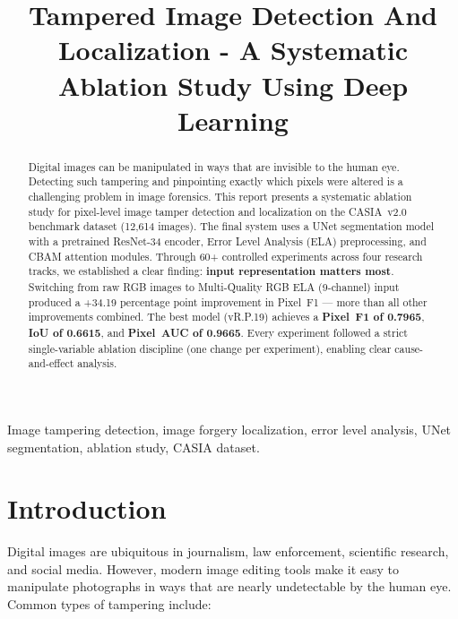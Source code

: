 \documentclass[conference]{IEEEtran}
\begin{document}
\title{ Tampered Image Detection And Localization - A Systematic Ablation Study Using Deep Learning}

\author{
}

\maketitle

\begin{abstract}
Digital images can be manipulated in ways that are invisible to the human eye. Detecting such tampering and pinpointing exactly which pixels were altered is a challenging problem in image forensics. This report presents a systematic ablation study for pixel-level image tamper detection and localization on the CASIA~v2.0 benchmark dataset (12,614 images). The final system uses a UNet segmentation model with a pretrained ResNet-34 encoder, Error Level Analysis (ELA) preprocessing, and CBAM attention modules. Through 60+ controlled experiments across four research tracks, we established a clear finding: \textbf{input representation matters most}. Switching from raw RGB images to Multi-Quality RGB ELA (9-channel) input produced a +34.19 percentage point improvement in Pixel~F1 --- more than all other improvements combined. The best model (vR.P.19) achieves a \textbf{Pixel~F1 of 0.7965}, \textbf{IoU of 0.6615}, and \textbf{Pixel~AUC of 0.9665}. Every experiment followed a strict single-variable ablation discipline (one change per experiment), enabling clear cause-and-effect analysis.
\end{abstract}

\begin{IEEEkeywords}
Image tampering detection, image forgery localization, error level analysis, UNet segmentation, ablation study, CASIA dataset.
\end{IEEEkeywords}


\section{Introduction}

Digital images are ubiquitous in journalism, law enforcement, scientific research, and social media. However, modern image editing tools make it easy to manipulate photographs in ways that are nearly undetectable by the human eye. Common types of tampering include:
\end{document}
